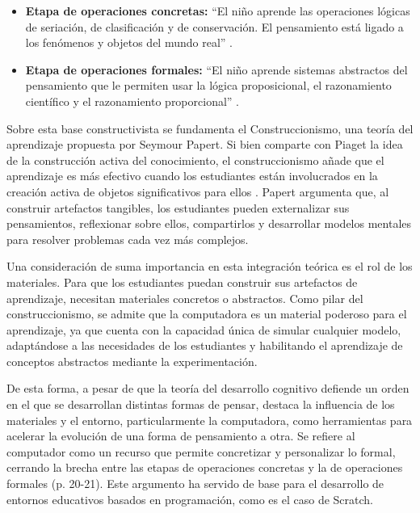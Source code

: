 \begin{itemize}
    \item \textbf{Etapa de operaciones concretas:} “El niño aprende las operaciones lógicas de seriación, de clasificación y de conservación. El pensamiento está ligado a los fenómenos y objetos del mundo real” \cite[p.~2]{linares2007}.
    \item \textbf{Etapa de operaciones formales:} “El niño aprende sistemas abstractos del pensamiento que le permiten usar la lógica proposicional, el razonamiento científico y el razonamiento proporcional” \cite[p.~2]{linares2007}.
\end{itemize}

Sobre esta base constructivista se fundamenta el Construccionismo, una teoría del aprendizaje propuesta por Seymour Papert. Si bien comparte con Piaget la idea de la construcción activa del conocimiento, el construccionismo añade que el aprendizaje es más efectivo cuando los estudiantes están involucrados en la creación activa de objetos significativos para ellos \cite[p.~892]{lodimartini2021}. Papert argumenta que, al construir artefactos tangibles, los estudiantes pueden externalizar sus pensamientos, reflexionar sobre ellos, compartirlos y desarrollar modelos mentales para resolver problemas cada vez más complejos.

Una consideración de suma importancia en esta integración teórica es el rol de los materiales. Para que los estudiantes puedan construir sus artefactos de aprendizaje, necesitan materiales concretos o abstractos. Como pilar del construccionismo, se admite que la computadora es un material poderoso para el aprendizaje, ya que cuenta con la capacidad única de simular cualquier modelo, adaptándose a las necesidades de los estudiantes y habilitando el aprendizaje de conceptos abstractos mediante la experimentación.

De esta forma, a pesar de que la teoría del desarrollo cognitivo defiende un orden en el que se desarrollan distintas formas de pensar,  destaca la influencia de los materiales y el entorno, particularmente la computadora, como herramientas para acelerar la evolución de una forma de pensamiento a otra. Se refiere al computador como un recurso que permite concretizar y personalizar lo formal, cerrando la brecha entre las etapas de operaciones concretas y la de operaciones formales (p. 20-21). Este argumento ha servido de base para el desarrollo de entornos educativos basados en programación, como es el caso de Scratch.

